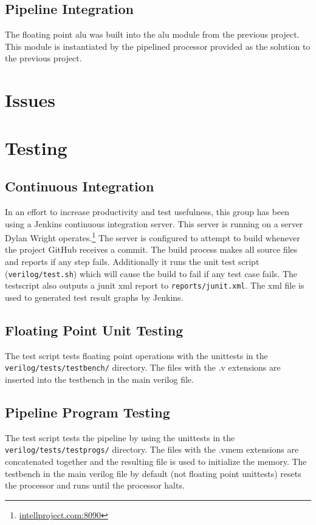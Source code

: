 \documentclass[conference]{IEEEtran}
\begin{document}
\subsection{Pipeline Integration}
The floating point alu was built into the alu module from the previous project.
This module is instantiated by the pipelined processor provided as the 
solution to the previous project.\cite{a3-sol}

\section{Issues}
\section{Testing}
\subsection{Continuous Integration}
In an effort to increase productivity and test usefulness, this group has
been using a Jenkins continuous integration server. This server is running
on a server Dylan Wright operates.\footnote{\url{intellproject.com:8090}} 
The server is configured to attempt to
build whenever the project GitHub receives a commit. The build process makes
all source files and reports if any step fails. Additionally it runs the
unit test script (\texttt{verilog/test.sh}) which will cause the build to fail
if any test case fails. The testscript also outputs a junit xml report to
\texttt{reports/junit.xml}. The xml file is used to generated test result
graphs by Jenkins. 

\subsection{Floating Point Unit Testing}
The test script tests floating point operations with the unittests in the
\texttt{verilog/tests/testbench/} directory. The files with the .v extensions
are inserted into the testbench in the main verilog file. 
\subsection{Pipeline Program Testing}
The test script tests the pipeline by using the unittests in the 
\texttt{verilog/tests/testprogs/} directory. The files with the .vmem 
extensions are concatenated together and the resulting file is used to 
initialize the memory. The testbench in the main verilog file by default (not
floating point unittests) resets the processor and runs until the processor
halts. 
\end{document}

